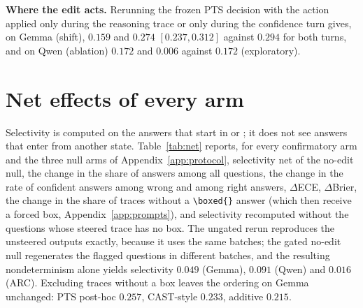 \textbf{Where the edit acts.} Rerunning the frozen PTS decision with the action
applied only during the reasoning trace or only during the confidence turn
gives, on Gemma (shift), $0.159$ and $0.274$ $[0.237, 0.312]$ against $0.294$
for both turns, and on Qwen (ablation) $0.172$ and $0.006$ against $0.172$
(exploratory).

\section{Net effects of every arm}
\label{app:net}

Selectivity is computed on the answers that start in \ocw{} or \crok{}; it does
not see answers that enter \ocw{} from another state. Table~\ref{tab:net}
reports, for every confirmatory arm and the three null arms of
Appendix~\ref{app:protocol}, selectivity net of the no-edit null, the change in
the share of \ocw{} answers among all questions, the change in the rate of
confident answers among wrong and among right answers, $\Delta$ECE,
$\Delta$Brier, the change in the share of traces without a \verb|\boxed{}|
answer (which then receive a forced box, Appendix~\ref{app:prompts}), and
selectivity recomputed without the questions whose steered trace has no box.
The ungated rerun reproduces the unsteered outputs exactly, because it uses the
same batches; the gated no-edit null regenerates the flagged questions in
different batches, and the resulting nondeterminism alone yields selectivity
$0.049$ (Gemma), $0.091$ (Qwen) and $0.016$ (ARC). Excluding traces without a
box leaves the ordering on Gemma unchanged: PTS post-hoc $0.257$, CAST-style
$0.233$, additive $0.215$.

